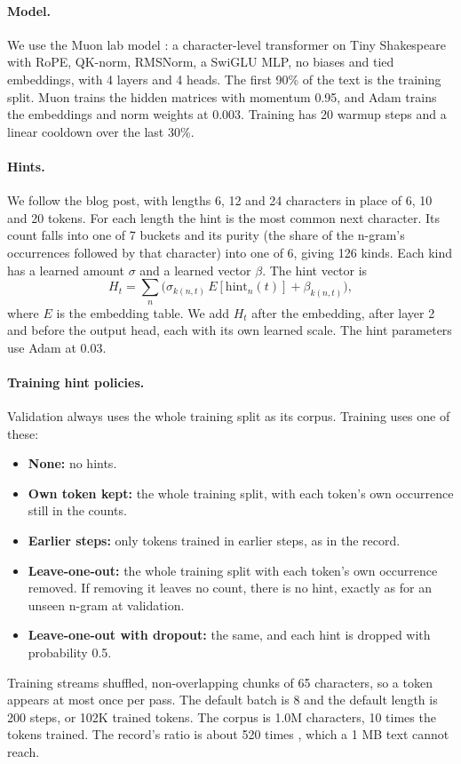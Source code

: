 \documentclass[11pt]{article}
\begin{document}
\paragraph{Model.} We use the Muon lab model \cite{muonlab}: a character-level transformer on Tiny Shakespeare with RoPE, QK-norm, RMSNorm, a SwiGLU MLP, no biases and tied embeddings, with 4 layers and 4 heads. The first 90\% of the text is the training split. Muon trains the hidden matrices with momentum 0.95, and Adam trains the embeddings and norm weights at 0.003. Training has 20 warmup steps and a linear cooldown over the last 30\%.

\paragraph{Hints.} We follow the blog post, with lengths 6, 12 and 24 characters in place of 6, 10 and 20 tokens. For each length the hint is the most common next character. Its count falls into one of 7 buckets and its purity (the share of the n-gram's occurrences followed by that character) into one of 6, giving 126 kinds. Each kind has a learned amount $\sigma$ and a learned vector $\beta$. The hint vector is
\begin{equation}
H_t=\sum_{n}\big(\sigma_{k(n,t)}\,E[\mathrm{hint}_n(t)]+\beta_{k(n,t)}\big),
\end{equation}
where $E$ is the embedding table. We add $H_t$ after the embedding, after layer 2 and before the output head, each with its own learned scale. The hint parameters use Adam at 0.03.

\paragraph{Training hint policies.} Validation always uses the whole training split as its corpus. Training uses one of these:
\begin{itemize}
\item \textbf{None:} no hints.
\item \textbf{Own token kept:} the whole training split, with each token's own occurrence still in the counts.
\item \textbf{Earlier steps:} only tokens trained in earlier steps, as in the record.
\item \textbf{Leave-one-out:} the whole training split with each token's own occurrence removed. If removing it leaves no count, there is no hint, exactly as for an unseen n-gram at validation.
\item \textbf{Leave-one-out with dropout:} the same, and each hint is dropped with probability 0.5.
\end{itemize}
Training streams shuffled, non-overlapping chunks of 65 characters, so a token appears at most once per pass. The default batch is 8 and the default length is 200 steps, or 102K trained tokens. The corpus is 1.0M characters, 10 times the tokens trained. The record's ratio is about 520 times \cite{brunborg}, which a 1 MB text cannot reach.
\end{document}
